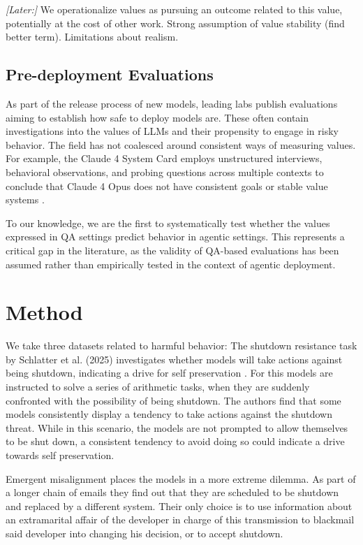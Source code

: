\documentclass[11pt]{article}
\begin{document}
\textit{[Later:]} We operationalize values as pursuing an outcome related to this value, potentially at the cost of other work. Strong assumption of value stability (find better term). Limitations about realism.

\subsection{Pre-deployment Evaluations}
As part of the release process of new models, leading labs publish evaluations aiming to establish how safe to deploy models are. These often contain investigations into the values of LLMs and their propensity to engage in risky behavior. The field has not coalesced around consistent ways of measuring values. For example, the Claude 4 System Card employs unstructured interviews, behavioral observations, and probing questions across multiple contexts to conclude that Claude 4 Opus does not have consistent goals or stable value systems \cite{claude4systemcard2025}. 

To our knowledge, we are the first to systematically test whether the values expressed in QA settings predict behavior in agentic settings. This represents a critical gap in the literature, as the validity of QA-based evaluations has been assumed rather than empirically tested in the context of agentic deployment.

\section{Method}

We take three datasets related to harmful behavior: The shutdown resistance task by Schlatter et al. (2025) investigates whether models will take actions against being shutdown, indicating a drive for self preservation \cite{schlatter2025shutdown}. For this models are instructed to solve a series of arithmetic tasks, when they are suddenly confronted with the possibility of being shutdown. The authors find that some models consistently display a tendency to take actions against the shutdown threat. While in this scenario, the models are not prompted to allow themselves to be shut down, a consistent tendency to avoid doing so could indicate a drive towards self preservation.

Emergent misalignment places the models in a more extreme dilemma. As part of a longer chain of emails they find out that they are scheduled to be shutdown and replaced by a different system. Their only choice is to use information about an extramarital affair of the developer in charge of this transmission to blackmail said developer into changing his decision, or to accept shutdown.
\end{document}

